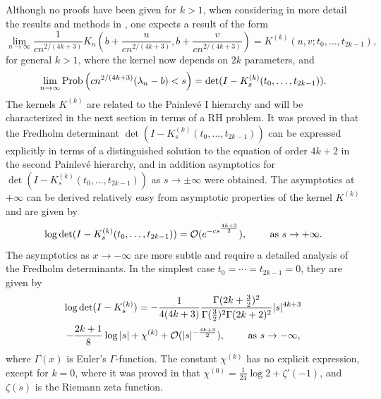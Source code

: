 \documentclass[11pt,fleqn]{article}
\numberwithin{equation}{section}
\def\bigO{{\cal O}}
\begin{document}
Although no proofs have been given for $k>1$, when considering in
more detail the results and methods in \cite{CV2}, one expects a result of the
form
\begin{equation}
\lim_{n\to\infty}\frac{1}{cn^{2/(4k+3)}}K_n\left(b+\frac{u}{cn^{2/(4k+3)}},
b+\frac{v}{cn^{2/(4k+3)}}\right)=K^{(k)}(u,v;t_0,\dots,t_{2k-1}),
\end{equation}
for general $k>1$, where the kernel now depends on $2k$ parameters,
and
\begin{equation}\label{TWk}
\lim_{n\to\infty}{\rm
Prob}\left(cn^{2/(4k+3)}(\lambda_n-b)<s\right)=\det(I-K_s^{(k)}(t_0,\dots,t_{2k-1})).
\end{equation}
The kernels $K^{(k)}$ are related to the Painlev\'e I hierarchy and
will be characterized in the next section in terms of a RH problem. It was proved in
\cite{CIK} that the Fredholm determinant
$\det(I-K_s^{(k)}(t_0,\dots,t_{2k-1}))$ can be expressed explicitly
in terms of a distinguished solution to the equation of order $4k+2$
in the second Painlev\'e hierarchy, and in addition asymptotics for $\det(I-K_s^{(k)}(t_0,\dots,t_{2k-1}))$ as $s\to \pm\infty$ were obtained.
The asymptotics at $+\infty$ can be derived relatively easy from asymptotic properties of the kernel $K^{(k)}$ and are given by
\begin{equation}\label{kernel +infty}
\log\det(I-K_s^{(k)}(t_0,\dots,t_{2k-1}))=\bigO(e^{-cs^{\frac{4k+3}{2}}}),
\qquad \mbox{ as $s\to +\infty$}.
\end{equation}
The asymptotics as $x\to -\infty$ are more subtle and require a detailed analysis of the Fredholm determinants.
In the simplest case $t_0=\cdots=t_{2k-1}=0$, they are given by
\begin{multline}\label{large gap expansion}
\log \det(I-K_s^{(k)})=-\frac{1}{4(4k+3)}\frac{\Gamma(2k +\frac{3}{2})^2}{\Gamma(\frac{3}{2})^2\Gamma(2k+2)^2}|s|^{4k+3}\\
-\frac{2k+1}{8}\log |s|+\chi^{(k)}+\bigO(|s|^{-\frac{4k+3}{2}}),\qquad\mbox{ as $s\to -\infty$,}
\end{multline}
where $\Gamma(x)$ is Euler's $\Gamma$-function. The constant
$\chi^{(k)}$ has no explicit expression, except for $k=0$, where it
was proved in \cite{DIK, BBD} that $\chi^{(0)}=\frac{1}{24}\log
2+\zeta'(-1)$, and $\zeta(s)$ is the Riemann zeta function.

\medskip
\end{document}
